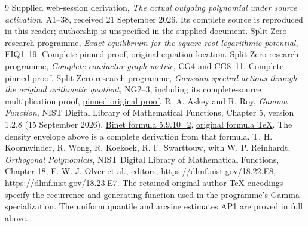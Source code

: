 \documentclass[11pt]{article}
\begin{document}
\begin{thebibliography}{9}
 Supplied web-session derivation,
\emph{The actual outgoing polynomial under source activation},
A1--38, received 21 September 2026. Its complete source is reproduced
in this reader; authorship is unspecified in the supplied document.
 Split-Zero research programme,
\emph{Exact equilibrium for the square-root logarithmic potential},
EIQ1--19.
\href{https://github.com/KokunoYumeto/zeta-function-research-reader/blob/5992ad50c0f2a06921f1fcaded7b4e38097c0739/workbenches/splitzero-tandem/continuations/20260920-original-kernel-mixed-determinants/providers/09_INPUT_CUMULATIVE_PROOFS.tex#L4381}{Complete pinned proof, original equation location}.
 Split-Zero research programme,
\emph{Complete conductor graph metric}, CG4 and CG8--11.
\href{https://github.com/KokunoYumeto/zeta-function-research-reader/blob/0fd693c844aad9117e30ec447c59864a28af10f3/workbenches/splitzero-tandem/continuations/20260921-native-spectral-real-pair/003/COMPLETE_CONDUCTOR_GRAPH_METRIC.tex}{Complete pinned proof}.
 Split-Zero research programme,
\emph{Gaussian spectral actions through the original arithmetic quotient},
NG2--3, including its complete-source multiplication proof,
\href{https://github.com/KokunoYumeto/zeta-function-research-reader/blob/5992ad50c0f2a06921f1fcaded7b4e38097c0739/workbenches/splitzero-tandem/continuations/20260920-original-kernel-mixed-determinants/providers/NATIVE_GAUSSIAN_TRANSFER.tex#L50}{pinned original proof}.
 R. A. Askey and R. Roy,
\emph{Gamma Function}, NIST Digital Library of Mathematical Functions,
Chapter 5, version 1.2.8 (15 September 2026),
\href{https://dlmf.nist.gov/5.9.E10_2}{Binet formula 5.9.10\_2},
\href{https://dlmf.nist.gov/5.9.E10_2.tex}{original formula TeX}.
The density envelope above is a complete derivation from that formula.
 T. H. Koornwinder, R. Wong, R. Koekoek,
R. F. Swarttouw, with W. P. Reinhardt,
\emph{Orthogonal Polynomials}, NIST Digital Library of Mathematical
Functions, Chapter 18, F. W. J. Olver et al., editors,
\url{https://dlmf.nist.gov/18.22.E8},
\url{https://dlmf.nist.gov/18.23.E7}.
The retained original-author TeX encodings specify the recurrence
and generating function used in the programme's Gamma specialization.
The uniform quantile and arcsine estimates AP1 are proved in full above.
\end{thebibliography}
\end{document}
